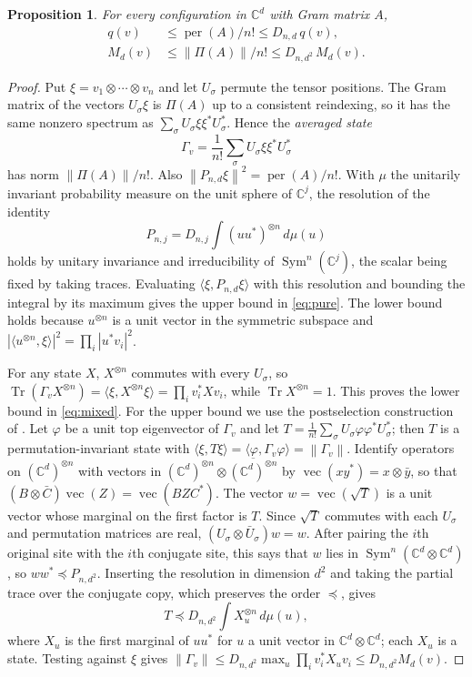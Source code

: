 \documentclass[11pt,a4paper]{article}
\newtheorem{proposition}[theorem]{Proposition}
\theoremstyle{remark}
\newcommand{\per}{\operatorname{per}}
\newcommand{\tr}{\operatorname{Tr}}
\newcommand{\norm}[1]{\left\lVert#1\right\rVert}
\newcommand{\C}{\mathbb C}
\DeclareMathOperator{\Sym}{Sym}
\begin{document}
\begin{proposition}\label{prop:compare}
For every configuration in $\C^d$ with Gram matrix $A$,
\begin{align}
 q(v)&\le \per(A)/n!\le D_{n,d}\,q(v),\label{eq:pure}\\
 M_d(v)&\le \norm{\Pi(A)}/n!\le D_{n,d^2}\,M_d(v).\label{eq:mixed}
\end{align}
\end{proposition}
\begin{proof}
Put $\xi=v_1\otimes\cdots\otimes v_n$ and let $U_\sigma$ permute the tensor positions. The Gram matrix of the vectors $U_\sigma\xi$ is $\Pi(A)$ up to a consistent reindexing, so it has the same nonzero spectrum as $\sum_\sigma U_\sigma\xi\xi^*U_\sigma^*$. Hence the \emph{averaged state}
\[
 \Gamma_v=\frac1{n!}\sum_{\sigma} U_\sigma\xi\xi^*U_\sigma^*
\]
has norm $\norm{\Pi(A)}/n!$. Also $\norm{P_{n,d}\xi}^2=\per(A)/n!$. With $\mu$ the unitarily invariant probability measure on the unit sphere of $\C^j$, the resolution of the identity
\[
 P_{n,j}=D_{n,j}\int (uu^*)^{\otimes n}\,d\mu(u)
\]
holds by unitary invariance and irreducibility of $\Sym^n(\C^j)$, the scalar being fixed by taking traces. Evaluating $\langle\xi,P_{n,d}\xi\rangle$ with this resolution and bounding the integral by its maximum gives the upper bound in \eqref{eq:pure}. The lower bound holds because $u^{\otimes n}$ is a unit vector in the symmetric subspace and $|\langle u^{\otimes n},\xi\rangle|^2=\prod_i|u^*v_i|^2$.

For any state $X$, $X^{\otimes n}$ commutes with every $U_\sigma$, so $\tr(\Gamma_vX^{\otimes n})=\langle\xi,X^{\otimes n}\xi\rangle=\prod_i v_i^*Xv_i$, while $\tr X^{\otimes n}=1$. This proves the lower bound in \eqref{eq:mixed}. For the upper bound we use the postselection construction of \cite{CKR}. Let $\varphi$ be a unit top eigenvector of $\Gamma_v$ and let $T=\frac1{n!}\sum_\sigma U_\sigma\varphi\varphi^*U_\sigma^*$; then $T$ is a permutation-invariant state with $\langle\xi,T\xi\rangle=\langle\varphi,\Gamma_v\varphi\rangle=\norm{\Gamma_v}$. Identify operators on $(\C^d)^{\otimes n}$ with vectors in $(\C^d)^{\otimes n}\otimes\overline{(\C^d)^{\otimes n}}$ by $\operatorname{vec}(xy^*)=x\otimes\bar y$, so that $(B\otimes\bar C)\operatorname{vec}(Z)=\operatorname{vec}(BZC^*)$. The vector $w=\operatorname{vec}(\sqrt T)$ is a unit vector whose marginal on the first factor is $T$. Since $\sqrt T$ commutes with each $U_\sigma$ and permutation matrices are real, $(U_\sigma\otimes\bar U_\sigma)w=w$. After pairing the $i$th original site with the $i$th conjugate site, this says that $w$ lies in $\Sym^n(\C^d\otimes\C^d)$, so $ww^*\preceq P_{n,d^2}$. Inserting the resolution in dimension $d^2$ and taking the partial trace over the conjugate copy, which preserves the order $\preceq$, gives
\[
 T\preceq D_{n,d^2}\int X_u^{\otimes n}\,d\mu(u),
\]
where $X_u$ is the first marginal of $uu^*$ for $u$ a unit vector in $\C^d\otimes\C^d$; each $X_u$ is a state. Testing against $\xi$ gives $\norm{\Gamma_v}\le D_{n,d^2}\max_u\prod_iv_i^*X_uv_i\le D_{n,d^2}M_d(v)$.
\end{proof}
\end{document}
